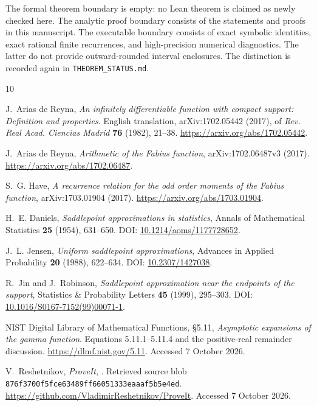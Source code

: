 \documentclass[11pt,a4paper]{article}
\numberwithin{equation}{section}
\theoremstyle{definition}\newtheorem{definition}[theorem]{Definition}
\theoremstyle{remark}\newtheorem{remark}[theorem]{Remark}
\begin{document}
The formal theorem boundary is empty: no Lean theorem is claimed as newly checked here. The analytic proof boundary consists of the statements and proofs in this manuscript. The executable boundary consists of exact symbolic identities, exact rational finite recurrences, and high-precision numerical diagnostics. The latter do not provide outward-rounded interval enclosures. The distinction is recorded again in \texttt{THEOREM\_STATUS.md}.

\begin{thebibliography}{10}
\raggedright
{}
J.~Arias de Reyna,
\emph{An infinitely differentiable function with compact support: Definition and properties}.
English translation, arXiv:1702.05442 (2017), of
\emph{Rev. Real Acad. Ciencias Madrid} \textbf{76} (1982), 21--38.
\url{https://arxiv.org/abs/1702.05442}.

J.~Arias de Reyna,
\emph{Arithmetic of the Fabius function}, arXiv:1702.06487v3 (2017).
\url{https://arxiv.org/abs/1702.06487}.

S.~G. Have,
\emph{A recurrence relation for the odd order moments of the Fabius function},
arXiv:1703.01904 (2017).
\url{https://arxiv.org/abs/1703.01904}.

H.~E. Daniels,
\emph{Saddlepoint approximations in statistics},
Annals of Mathematical Statistics \textbf{25} (1954), 631--650.
DOI: \href{https://doi.org/10.1214/aoms/1177728652}{10.1214/aoms/1177728652}.

J.~L. Jensen,
\emph{Uniform saddlepoint approximations},
Advances in Applied Probability \textbf{20} (1988), 622--634.
DOI: \href{https://doi.org/10.2307/1427038}{10.2307/1427038}.

R.~Jin and J.~Robinson,
\emph{Saddlepoint approximation near the endpoints of the support},
Statistics \& Probability Letters \textbf{45} (1999), 295--303.
DOI: \href{https://doi.org/10.1016/S0167-7152(99)00071-1}{10.1016/S0167-7152(99)00071-1}.

NIST Digital Library of Mathematical Functions,
\S5.11, \emph{Asymptotic expansions of the gamma function}.
Equations 5.11.1--5.11.4 and the positive-real remainder discussion.
\url{https://dlmf.nist.gov/5.11}. Accessed 7 October 2026.

V.~Reshetnikov, \emph{ProveIt},
.
Retrieved source blob \texttt{876f3700f5fce63489ff66051333eaaaf5b5e4ed}.
\url{https://github.com/VladimirReshetnikov/ProveIt}. Accessed 7 October 2026.


\end{thebibliography}
\end{document}
